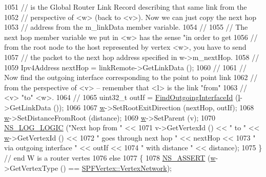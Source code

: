 \begin{DoxyCode}
1051 \textcolor{comment}{// is the Global Router Link Record describing that same link from the }
1052 \textcolor{comment}{// perspective of <w> (back to <v>).  Now we can just copy the next hop }
1053 \textcolor{comment}{// address from the m\_linkData member variable.}
1054 \textcolor{comment}{// }
1055 \textcolor{comment}{// The next hop member variable we put in <w> has the sense "in order to get}
1056 \textcolor{comment}{// from the root node to the host represented by vertex <w>, you have to send}
1057 \textcolor{comment}{// the packet to the next hop address specified in w->m\_nextHop.}
1058 \textcolor{comment}{//}
1059           Ipv4Address nextHop = linkRemote->GetLinkData ();
1060 \textcolor{comment}{// }
1061 \textcolor{comment}{// Now find the outgoing interface corresponding to the point to point link}
1062 \textcolor{comment}{// from the perspective of <v> -- remember that <l> is the link "from"}
1063 \textcolor{comment}{// <v> "to" <w>.}
1064 \textcolor{comment}{//}
1065           uint32\_t outIf = \hyperlink{classns3_1_1GlobalRouteManagerImpl_a55b3c7bf042d95de52cf56cc6699dc9a}{FindOutgoingInterfaceId} (\hyperlink{buildings__pathloss_8m_a5b54c0a045f179bcbbbc9abcb8b5cd4c}{l}->GetLinkData ());
1066 
1067           \hyperlink{lte_2model_2fading-traces_2fading__trace__generator_8m_afd61ec66f9d7b807eece6eb12c781844}{w}->SetRootExitDirection (nextHop, outIf);
1068           \hyperlink{lte_2model_2fading-traces_2fading__trace__generator_8m_afd61ec66f9d7b807eece6eb12c781844}{w}->SetDistanceFromRoot (distance);
1069           \hyperlink{lte_2model_2fading-traces_2fading__trace__generator_8m_afd61ec66f9d7b807eece6eb12c781844}{w}->SetParent (v);
1070           \hyperlink{group__logging_ga88acd260151caf2db9c0fc84997f45ce}{NS\_LOG\_LOGIC} (\textcolor{stringliteral}{"Next hop from "} << 
1071                         v->GetVertexId () << \textcolor{stringliteral}{" to "} << \hyperlink{lte_2model_2fading-traces_2fading__trace__generator_8m_afd61ec66f9d7b807eece6eb12c781844}{w}->GetVertexId () <<
1072                         \textcolor{stringliteral}{" goes through next hop "} << nextHop <<
1073                         \textcolor{stringliteral}{" via outgoing interface "} << outIf <<
1074                         \textcolor{stringliteral}{" with distance "} << distance);
1075         \}  \textcolor{comment}{// end W is a router vertes}
1076       \textcolor{keywordflow}{else} 
1077         \{
1078           \hyperlink{assert_8h_a6dccdb0de9b252f60088ce281c49d052}{NS\_ASSERT} (\hyperlink{lte_2model_2fading-traces_2fading__trace__generator_8m_afd61ec66f9d7b807eece6eb12c781844}{w}->GetVertexType () == \hyperlink{classns3_1_1SPFVertex_a20f8a4cfc99a1b7ecd10a23151b93afda00415acb788d8d95bee545fe2046c2a8}{SPFVertex::VertexNetwork});

\end{DoxyCode}
